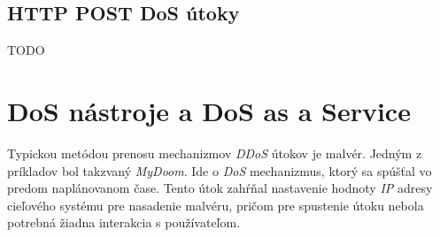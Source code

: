 \documentclass[
  printed, %
  table,   %
  lof,     %
  lot,     %
]{fithesis3}
\begin{document}
\subsection{HTTP POST DoS útoky}
TODO

\section{DoS nástroje a DoS as a Service}
Typickou metódou prenosu mechanizmov \textit{DDoS} útokov je malvér. Jedným z príkladov bol
takzvaný \textit{MyDoom}. Ide o \textit{DoS} mechanizmus, ktorý sa spúšťal vo predom naplánovanom čase.
Tento útok zahŕňal nastavenie hodnoty \textit{IP} adresy cieľového systému pre nasadenie malvéru,
pričom pre spustenie útoku nebola potrebná žiadna interakcia s používateľom.
\end{document}
